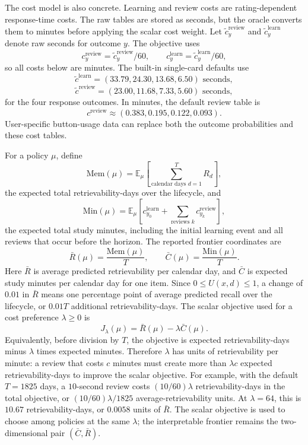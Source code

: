 \documentclass[11pt]{article}
\begin{document}
The cost model is also concrete. Learning and review costs are rating-dependent response-time costs. The raw tables are stored as seconds, but the oracle converts them to minutes before applying the scalar cost weight. Let \(\tilde c_y^{\mathrm{review}}\) and \(\tilde c_y^{\mathrm{learn}}\) denote raw seconds for outcome \(y\). The objective uses
\[
c_y^{\mathrm{review}}=\tilde c_y^{\mathrm{review}}/60,
\qquad
c_y^{\mathrm{learn}}=\tilde c_y^{\mathrm{learn}}/60,
\]
so all costs below are minutes. The built-in single-card defaults use
\[
\tilde c^{\mathrm{learn}}=(33.79,24.30,13.68,6.50)\text{ seconds},
\]
\[
\tilde c^{\mathrm{review}}=(23.00,11.68,7.33,5.60)\text{ seconds},
\]
for the four response outcomes. In minutes, the default review table is
\[
c^{\mathrm{review}}\approx(0.383,0.195,0.122,0.093).
\]
User-specific button-usage data can replace both the outcome probabilities and these cost tables.

For a policy \(\mu\), define
\[
\mathrm{Mem}(\mu)
=
\mathbb{E}_{\mu}
\left[
\sum_{\text{calendar days }d=1}^{T}
R_d
\right],
\]
the expected total retrievability-days over the lifecycle, and
\[
\mathrm{Min}(\mu)
=
\mathbb{E}_{\mu}
\left[
c_{y_0}^{\mathrm{learn}}
+
\sum_{\text{reviews }k}
c_{y_k}^{\mathrm{review}}
\right],
\]
the expected total study minutes, including the initial learning event and all reviews that occur before the horizon. The reported frontier coordinates are
\[
\bar{R}(\mu)=\frac{\mathrm{Mem}(\mu)}{T},
\qquad
\bar{C}(\mu)=\frac{\mathrm{Min}(\mu)}{T}.
\]
Here \(\bar{R}\) is average predicted retrievability per calendar day, and \(\bar{C}\) is expected study minutes per calendar day for one item. Since \(0\le U(x,d)\le1\), a change of \(0.01\) in \(\bar{R}\) means one percentage point of average predicted recall over the lifecycle, or \(0.01T\) additional retrievability-days. The scalar objective used for a cost preference \(\lambda\ge 0\) is
\[
J_\lambda(\mu)=\bar{R}(\mu)-\lambda \bar{C}(\mu).
\]
Equivalently, before division by \(T\), the objective is expected retrievability-days minus \(\lambda\) times expected minutes. Therefore \(\lambda\) has units of retrievability per minute: a review that costs \(c\) minutes must create more than \(\lambda c\) expected retrievability-days to improve the scalar objective. For example, with the default \(T=1825\) days, a \(10\)-second review costs \((10/60)\lambda\) retrievability-days in the total objective, or \((10/60)\lambda/1825\) average-retrievability units. At \(\lambda=64\), this is \(10.67\) retrievability-days, or \(0.0058\) units of \(\bar{R}\). The scalar objective is used to choose among policies at the same \(\lambda\); the interpretable frontier remains the two-dimensional pair \((\bar{C},\bar{R})\).
\end{document}
